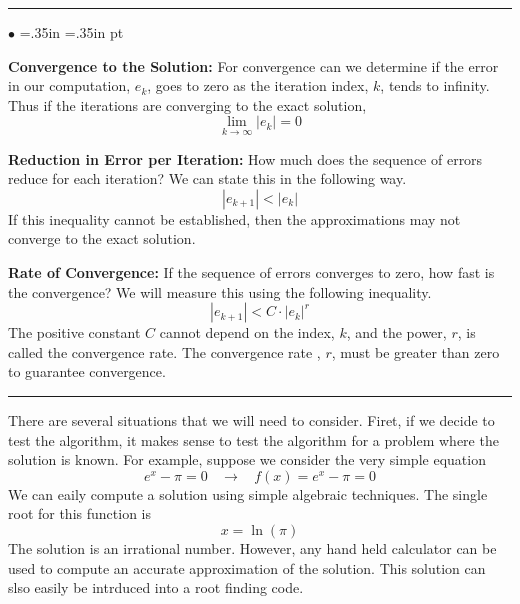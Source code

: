 \documentclass[10pt,fleqn]{article}
\begin{document}
\vskip0.1in\hrule\vskip0.1in
\begin{list}{$\bullet$}{ \parsep=0pt \listparindent=0pt
\topsep=0pt \rightmargin=.35in \leftmargin=.35in  pt
\itemsep=2pt}
  \item {\bf Convergence to the Solution:} For convergence can we determine if
        the error in our computation, $e_k$, goes to zero as the iteration
        index, $k$, tends to infinity. Thus if the iterations are converging to
        the exact solution,
        $$
          \lim_{k\rightarrow\infty} |e_k| = 0
        $$  
  \item {\bf Reduction in Error per Iteration:} How much does the sequence of
        errors reduce for each iteration? We can state this in the following
        way.
        $$
          |e_{k+1}| < |e_k|
        $$
        If this inequality cannot be established, then the approximations may
        not converge to the exact solution.
  \item {\bf Rate of Convergence:} If the sequence of errors converges to zero,
        how fast is the convergence?  We will measure this using the following
        inequality.
        $$
          |e_{k+1}| < C\cdot |e_k|^r
        $$
        The positive constant $C$ cannot depend on the index, $k$, and the
        power, $r$, is called the convergence rate. The convergence rate , $r$,
        must be greater than zero to guarantee convergence.
\end{list}
\vskip0.1in\hrule\vskip0.1in
\noindent
There are several situations that we will need to consider. Firet, if we decide
to test the algorithm, it makes sense to test the algorithm for a problem where
the solution is known. For example, suppose we consider the very simple equation
$$
  e^x - \pi = 0 \ \ \ \ \rightarrow \ \ \ \ f(x) = e^x - \pi = 0
$$
We can eaily compute a solution using simple algebraic techniques. The single
root for this function is
$$
  x = \ln(\pi)
$$
The solution is an irrational number. However, any hand held calculator can be
used to compute an accurate approximation of the solution. This solution can
slso easily be intrduced into a root finding code.
\end{document}
